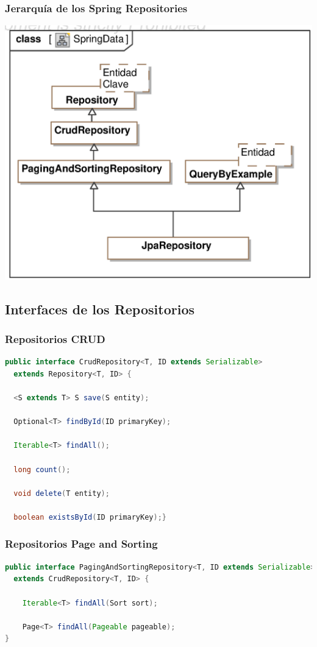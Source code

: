 \documentclass[a4paper,slidestop,xcolor=pst,blue]{beamer}
\begin{document}
\begin{frame}[c]
    \frametitle{Jerarquía de los Spring Repositories}
    \begin{center}
        \includegraphics[width=.8\linewidth]{images/spring/SpringData.eps}
    \end{center}
\end{frame}

\subsection{Interfaces de los Repositorios}

\begin{frame}[c,fragile]
    \frametitle{Repositorios CRUD}
    \begin{lstlisting}[basicstyle=\footnotesize,language=Java]
public interface CrudRepository<T, ID extends Serializable>
  extends Repository<T, ID> {

  <S extends T> S save(S entity);

  Optional<T> findById(ID primaryKey);

  Iterable<T> findAll();

  long count();

  void delete(T entity);

  boolean existsById(ID primaryKey);}

\end{lstlisting}
\end{frame}

\begin{frame}[c,fragile]
    \frametitle{Repositorios Page and Sorting}
    \begin{lstlisting}[basicstyle=\footnotesize,language=Java]
public interface PagingAndSortingRepository<T, ID extends Serializable>
  extends CrudRepository<T, ID> {

    Iterable<T> findAll(Sort sort);

    Page<T> findAll(Pageable pageable);
}
    \end{lstlisting}
\end{frame}
\end{document}
